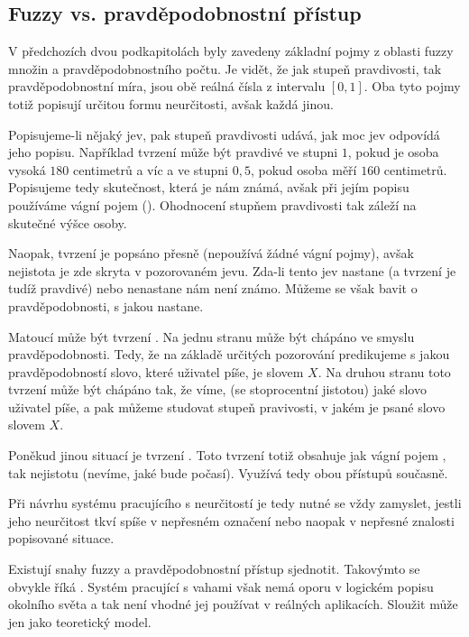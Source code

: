 \documentclass[a4paper,10pt]{article}
\begin{document}
\subsection{Fuzzy vs. pravděpodobnostní přístup} \label{subsec:FuzzyVsProb}
V předchozích dvou podkapitolách byly zavedeny základní pojmy z oblasti fuzzy množin a pravděpodobnostního počtu. Je vidět, že jak stupeň pravdivosti, tak pravděpodobnostní míra, jsou obě reálná čísla z intervalu $[0, 1]$. Oba tyto pojmy totiž popisují určitou formu neurčitosti, avšak každá jinou. 

Popisujeme-li nějaký jev, pak stupeň pravdivosti udává, jak moc jev odpovídá jeho popisu. Například tvrzení  může být pravdivé ve stupni $1$, pokud je osoba vysoká $180$ centimetrů a víc a ve stupni $0,5$, pokud osoba měří $160$ centimetrů. Popisujeme tedy skutečnost, která je nám známá, avšak při jejím popisu používáme vágní pojem (). Ohodnocení stupňem pravdivosti tak záleží na skutečné výšce osoby.

Naopak, tvrzení  je popsáno přesně (nepoužívá žádné vágní pojmy), avšak nejistota je zde skryta v pozorovaném jevu. Zda-li tento jev nastane (a tvrzení je tudíž pravdivé) nebo nenastane nám není známo. Můžeme se však bavit o pravděpodobnosti, s jakou nastane.

Matoucí může být tvrzení . Na jednu stranu může být chápáno ve smyslu pravděpodobnosti. Tedy, že na základě určitých pozorování predikujeme s jakou pravděpodobností slovo, které uživatel píše, je slovem $X$. Na druhou stranu toto tvrzení může být chápáno tak, že víme, (se stoprocentní jistotou) jaké slovo uživatel píše, a pak můžeme studovat stupeň pravivosti, v jakém je psané slovo slovem $X$.

Poněkud jinou situací je tvrzení . Toto tvrzení totiž obsahuje jak vágní pojem , tak nejistotu (nevíme, jaké bude počasí). Využívá tedy obou přístupů současně.

Při návrhu systému pracujícího s neurčitostí je tedy nutné se vždy zamyslet, jestli jeho neurčitost tkví spíše v nepřesném označení nebo naopak v nepřesné znalosti popisované situace.

\begin{note}
 Existují snahy fuzzy a pravděpodobnostní přístup sjednotit. Takovýmto  se obvykle říká . Systém pracující s vahami však nemá oporu v logickém popisu okolního světa a tak není vhodné jej používat v reálných aplikacích. Sloužit může jen jako teoretický model.
\end{note}
\end{document}
